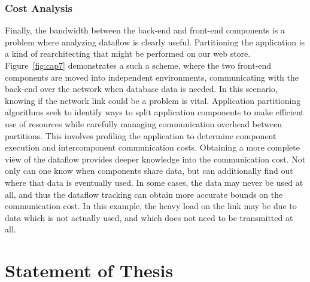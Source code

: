 \documentclass[msc,oneside]{ubcthesis}
\begin{document}
\subsubsection{Cost Analysis}
Finally, the bandwidth between the back-end and front-end components is a problem where analyzing dataflow is clearly useful. Partitioning the application is a kind of rearchitecting that might be performed on our web store. Figure~\ref{fig:cap7} demonstrates a such a scheme, where the two front-end components are moved into independent environments, communicating with the back-end over the network when database data is needed. In this scenario, knowing if the network link could be a problem is vital. Application partitioning algorithms seek to identify ways to split application components to make efficient use of resources while carefully managing communication overhead between partitions. This involves profiling the application to determine component execution and intercomponent communication costs. Obtaining a more complete view of the dataflow provides deeper knowledge into the communication cost. Not only can one know when components share data, but can additionally find out where that data is eventually used. In some cases, the data may never be used at all, and thus the dataflow tracking can obtain more accurate bounds on the communication cost. In this example, the heavy load on the link may be due to data which is not actually used, and which does not need to be transmitted at all.
	

\section{Statement of Thesis}
	
\end{document}
